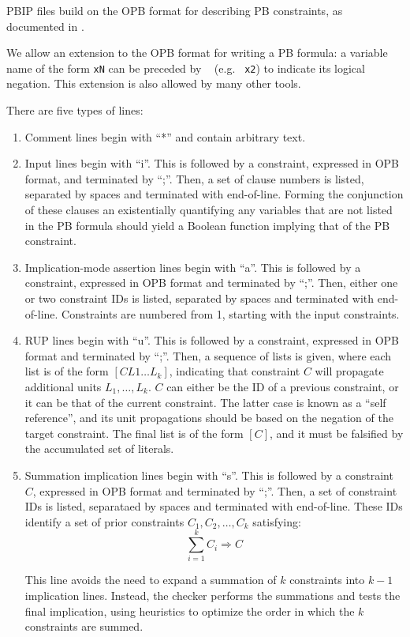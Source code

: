 \message{ !name(FMCAD2024.tex)}\documentclass{fmcad}
\begin{document}
PBIP files build on the OPB format for describing PB constraints, as documented in \cite{roussel2012input}.

We allow an extension to the OPB format for writing a PB formula: a variable name of the form
\texttt{xN} can be preceded by \texttt{~} (e.g. \texttt{~x2}) to indicate its logical negation.
This extension is also allowed by many other tools.

There are five types of lines:
\begin{enumerate}
\item Comment lines begin with ``*'' and contain arbitrary text.
\item Input lines begin with ``i''. This is followed by a constraint, expressed in OPB format,
  and terminated by ``;''. Then, a set of clause numbers is listed, separated by spaces and
  terminated with end-of-line. Forming the conjunction of these clauses an existentially quantifying
  any variables that are not listed in the PB formula should yield a Boolean function implying that
  of the PB constraint.
\item Implication-mode assertion lines begin with ``a''. This is followed by a constraint,
  expressed in OPB format and terminated by ``;''. Then, either one or two constraint IDs is
  listed, separated by spaces and terminated with end-of-line. Constraints are numbered from 1,
  starting with the input constraints.
\item RUP lines begin with ``u''. This is followed by a constraint, expressed in OPB format and
  terminated by ``;''. Then, a sequence of lists is given, where each list is of the form
  $[C L1 \dots L_k]$, indicating that constraint $C$ will propagate additional units
  $L_1, \dots, L_k$. $C$ can either be the ID of a previous constraint, or it can be that
  of the current constraint. The latter case is known as a ``self reference'', and its unit
  propagations should be based on the negation of the target constraint. The final list is of
  the form $[C]$, and it must be falsified by the accumulated set of literals.
\item Summation implication lines begin with ``s''. This is followed by a constraint $C$,
  expressed in OPB format and terminated by ``;''. Then, a set of constraint IDs is listed,
  separataed by spaces and terminated with end-of-line. These IDs identify a set of prior constraints
  $C_1, C_2, \dots, C_k$ satisfying:
  \[
    \sum_{i = 1}^{k} C_i \Longrightarrow C
  \]

  This line avoids the need to expand a summation of $k$ constraints into $k - 1$ implication lines.
  Instead, the checker performs the summations and tests the final implication, using heuristics
  to optimize the order in which the $k$ constraints are summed.
\end{enumerate}
\end{document}
